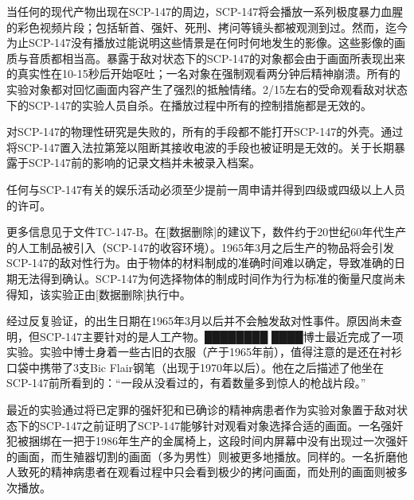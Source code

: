 当任何的现代产物出现在SCP-147的周边，SCP-147将会播放一系列极度暴力血腥的彩色视频片段；包括斩首、强奸、死刑、拷问等镜头都被观测到过。然而，迄今为止SCP-147没有播放过能说明这些情景是在何时何地发生的影像。这些影像的画质与音质都相当高。暴露于敌对状态下的SCP-147的对象都会由于画面所表现出来的真实性在10-15秒后开始呕吐；一名对象在强制观看两分钟后精神崩溃。所有的实验对象都对回忆画面内容产生了强烈的抵触情绪。2\slash 15左右的受命观看敌对状态下的SCP-147的实验人员自杀。在播放过程中所有的控制措施都是无效的。

对SCP-147的物理性研究是失败的，所有的手段都不能打开SCP-147的外壳。通过将SCP-147置入法拉第笼以阻断其接收电波的手段也被证明是无效的。关于长期暴露于SCP-147前的影响的记录文档并未被录入档案。

任何与SCP-147有关的娱乐活动必须至少提前一周申请并得到四级或四级以上人员的许可。

更多信息见于文件TC-147-B。在{[}数据删除]的建议下，数件约于20世纪60年代生产的人工制品被引入（SCP-147的收容环境）。1965年3月之后生产的物品将会引发SCP-147的敌对性行为。由于物体的材料制成的准确时间难以确定，导致准确的日期无法得到确认。SCP-147为何选择物体的制成时间作为行为标准的衡量尺度尚未得知，该实验正由{[}数据删除]执行中。

经过反复验证，的出生日期在1965年3月以后并不会触发敌对性事件。原因尚未查明，但SCP-147主要针对的是人工产物。████████ ████博士最近完成了一项实验。实验中博士身着一些古旧的衣服（产于1965年前），值得注意的是还在衬衫口袋中携带了3支Bic Flair钢笔（出现于1970年以后）。他在之后描述了他坐在SCP-147前所看到的：“一段从没看过的，有着数量多到惊人的枪战片段。”

最近的实验通过将已定罪的强奸犯和已确诊的精神病患者作为实验对象置于敌对状态下的SCP-147之前证明了SCP-147能够针对观看对象选择合适的画面。一名强奸犯被捆绑在一把于1986年生产的金属椅上，这段时间内屏幕中没有出现过一次强奸的画面，而生殖器切割的画面（多为男性）则被更多地播放。同样的。一名折磨他人致死的精神病患者在观看过程中只会看到极少的拷问画面，而处刑的画面则被多次播放。
